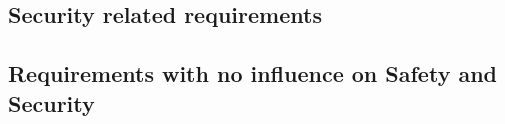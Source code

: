 





        
	 	

\subsection{Security related requirements}


\subsection{Requirements with no influence on Safety and Security}


